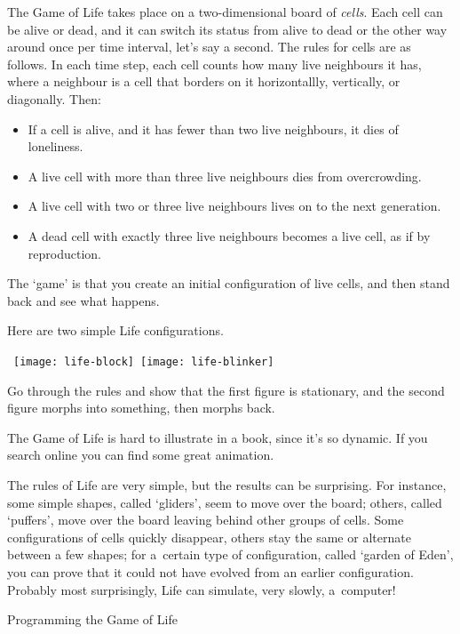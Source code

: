 The Game of Life takes place on
a two-dimensional board of \emph{cells}. Each cell can be
alive or dead, and it can switch its status from alive to dead
or the other way around once per time interval, let's say a second.
The rules for cells are as follows. In each time step, each cell
counts how many live neighbours it has, where a neighbour is a cell
that borders on it horizontallly, vertically, or diagonally. Then:
\begin{itemize}
\item If a cell is alive, and it has fewer than two live neighbours, it dies of loneliness.
\item A live cell with more than three live neighbours dies from overcrowding.
\item A live cell with two or three live neighbours lives on to the next generation.
\item A dead cell with exactly three live neighbours becomes a live cell, as if by reproduction.
\end{itemize}
The `game' is that you create an initial configuration of live cells, and then
stand back and see what happens. 
\begin{exercise}
  Here are two simple Life configurations.

  \ \hbox{\texttt{[image: life-block]} \texttt{[image: life-blinker]}}
  
  Go through the rules and show that the first figure is stationary,
  and the second figure morphs into something, then morphs back.
\end{exercise}
The Game of Life is hard to illustrate in a book, since it's so dynamic.
If you search online you can find some great animation.

The rules of Life are very simple, but the results can be surprising. For
instance, some simple shapes, called `gliders', seem to move over the
board; others, called `puffers', move over the board leaving behind
other groups of cells. Some configurations of cells quickly disappear,
others stay the same or alternate between a few shapes; for a~certain
type of configuration, called `garden of Eden', you can prove that it
could not have evolved from an earlier configuration. Probably most
surprisingly, Life can simulate, very slowly, a~computer!

 {Programming the Game of Life}

